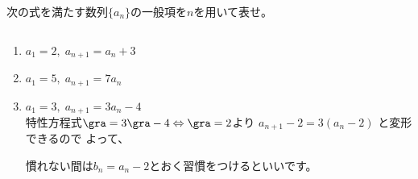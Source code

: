 \documentclass[a4paper]{ltjsarticle}
\begin{document}
\begin{question*}
次の式を満たす数列$\{a_n\}$の一般項を$n$を用いて表せ。
\begin{ans*}
${}$
\begin{enumerate}[label=\arabic*.]
  \item $a_1 = 2,\; a_{n+1} = a_n + 3 $\tousa
  \item $a_1 = 5,\; a_{n+1} = 7a_n$ \touhi
  \item $a_1 = 3,\; a_{n+1} = 3a_n -4$ \tokusyukai \\
  特性方程式$\gra = 3\gra -4 \Leftrightarrow \gra = 2$より
  $a_{n+1} - 2 = 3(a_n - 2)$ \touhi と変形できるので
  よって、
  \begin{supple*}
    慣れない間は$b_n = a_n - 2$とおく習慣をつけるといいです。
  \end{supple*}


\end{enumerate}
\end{ans*}
\end{question*}
\end{document}
